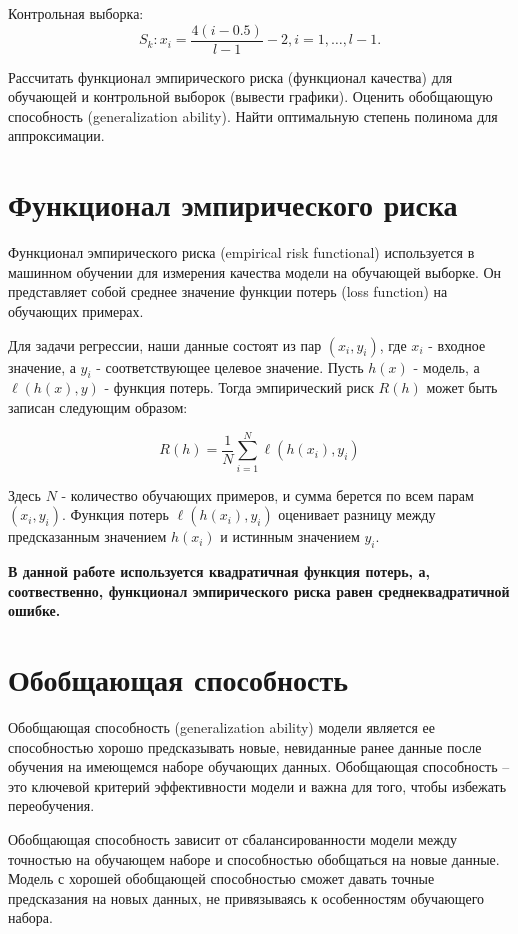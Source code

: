 \documentclass[12pt]{report}
\begin{document}
Контрольная выборка:
\begin{equation}
S_k: x_i = \frac{4(i-0.5)}{l-1} - 2, i=1,\ldots,l-1.
\end{equation}

Рассчитать функционал эмпирического риска (функционал качества) для обучающей и контрольной выборок (вывести графики). Оценить обобщающую способность (generalization ability). Найти оптимальную степень полинома для аппроксимации.

\section{Функционал эмпирического риска}

Функционал эмпирического риска (empirical risk functional) используется в машинном обучении для измерения качества модели на обучающей выборке. Он представляет собой среднее значение функции потерь (loss function) на обучающих примерах.

Для задачи регрессии, наши данные состоят из пар $(x_i, y_i)$, где $x_i$ - входное значение, а $y_i$ - соответствующее целевое значение. Пусть $h(x)$ - модель, а $\ell(h(x), y)$ - функция потерь. Тогда эмпирический риск $R(h)$ может быть записан следующим образом:

\begin{equation*}
R(h) = \frac{1}{N} \sum_{i=1}^{N} \ell(h(x_i), y_i)
\end{equation*}

Здесь $N$ - количество обучающих примеров, и сумма берется по всем парам $(x_i, y_i)$. Функция потерь $\ell(h(x_i), y_i)$ оценивает разницу между предсказанным значением $h(x_i)$ и истинным значением $y_i$. 

\textbf{В данной работе используется квадратичная функция потерь, а, соотвественно, функционал эмпирического риска равен среднеквадратичной ошибке.} 

\section{Обобщающая способность}

Обобщающая способность (generalization ability) модели является ее способностью хорошо предсказывать новые, невиданные ранее данные после обучения на имеющемся наборе обучающих данных. Обобщающая способность -- это ключевой критерий эффективности модели и важна для того, чтобы избежать переобучения.

Обобщающая способность зависит от сбалансированности модели между точностью на обучающем наборе и способностью обобщаться на новые данные. Модель с хорошей обобщающей способностью сможет давать точные предсказания на новых данных, не привязываясь к особенностям обучающего набора.
\end{document}
